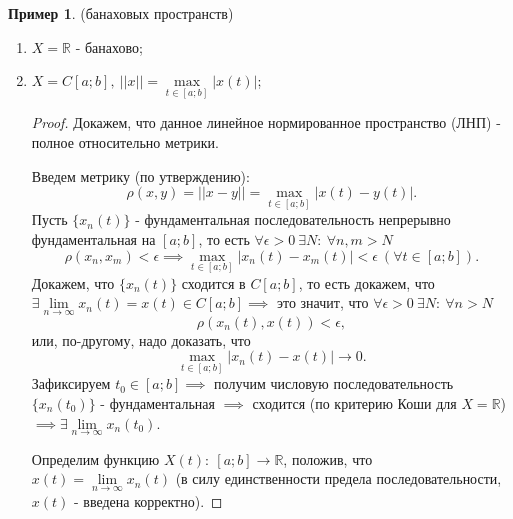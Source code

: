 \documentclass{report}
\theoremstyle{definition}
\newtheorem{example}{Пример}
\begin{document}
\begin{example}
  (банаховых пространств)

  \begin{enumerate}
    \item $X = \mathbb{R}$ - банахово;
    \item $X = C[a;b], \ ||x|| = \underset{t \in [a;b]}{\max}|x(t)|$;
          \begin{proof}
            Докажем, что данное линейное нормированное пространство (ЛНП) - полное относительно метрики.

            Введем метрику (по утверждению):
            \begin{equation*}
              \rho(x,y) = ||x-y|| = \underset{t \in [a;b]}{\max}|x(t) - y(t)|.
            \end{equation*}
            Пусть $\{x_n (t)\}$ - фундаментальная последовательность непрерывно фундаментальная на $[a;b]$, то есть
            $\forall \epsilon > 0 \ \exists N: \ \forall n,m  > N$
            \begin{equation*}
              \rho(x_n,x_m) < \epsilon \implies \underset{t \in [a;b]}{\max}|x_n(t) - x_m(t)| < \epsilon \ (\forall
              t \in [a;b]).
            \end{equation*}
            Докажем, что $\{x_n (t)\}$ сходится в $C[a;b]$, то есть докажем, что $\exists \underset{n\rightarrow
                \infty}{\lim}x_n (t) = x(t) \in C[a;b] \implies$ это значит, что $\forall \epsilon > 0 \
              \exists N: \ \forall n > N$
            \begin{equation*}
              \rho(x_n (t), x(t)) < \epsilon,
            \end{equation*}
            или, по-другому, надо доказать, что
            \begin{equation*}
              \underset{t\in[a;b]}{\max}|x_n(t) - x(t)| \rightarrow 0.
            \end{equation*}
            Зафиксируем $t_0 \in [a;b] \implies$ получим числовую последовательность $\{x_n(t_0)\}$ - фундаментальная
            $\implies$ сходится (по критерию Коши для $X = \mathbb{R}$) $\implies \exists \underset{n\rightarrow\infty}
              {\lim}x_n(t_0)$.

            Определим функцию $X(t): \ [a;b]\rightarrow \mathbb{R}$, положив, что $x(t) = \underset{n\rightarrow\infty}
              {\lim}x_n(t)$ (в силу единственности предела последовательности, $x(t)$ - введена корректно).


\end{proof}
\end{enumerate}
\end{example}
\end{document}
